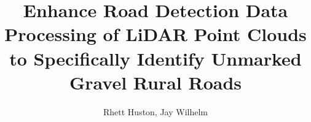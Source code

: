 \documentclass[journal,onecolumn]{IEEEtran}
\begin{document}
	\title{Enhance Road Detection Data Processing of LiDAR Point Clouds to Specifically Identify Unmarked Gravel Rural Roads}
	
	\author{Rhett Huston, Jay Wilhelm}
	
\end{document}
